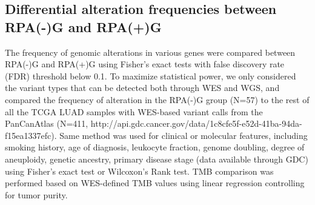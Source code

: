 \documentclass[phd,tocprelim]{cornell}
\begin{document}
\subsection*{Differential alteration frequencies between RPA(-)G and RPA(+)G}
The frequency of genomic alterations in various genes were compared between RPA(-)G and RPA(+)G using Fisher’s exact tests with false discovery rate (FDR) threshold below 0.1. To maximize statistical power, we only considered the variant types that can be detected both through WES and WGS, and compared the frequency of alteration in the RPA(-)G group (N=57) to the rest of all the TCGA LUAD samples with WES-based variant calls from the PanCanAtlas (N=411, http://api.gdc.cancer.gov/data/1c8cfe5f-e52d-41ba-94da-f15ea1337efc). Same method was used for clinical or molecular features, including smoking history, age of diagnosis, leukocyte fraction, genome doubling, degree of aneuploidy, genetic ancestry, primary disease stage (data available through GDC) using Fisher’s exact test or Wilcoxon’s Rank test. TMB comparison was performed based on WES-defined TMB values using linear regression controlling for tumor purity. 

\end{document}
